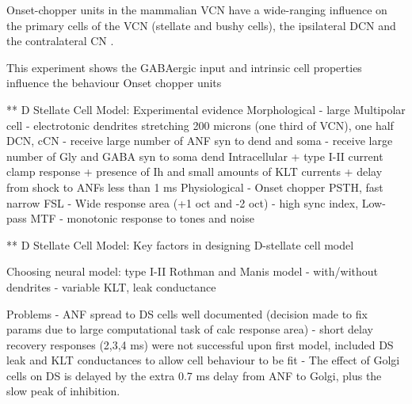 Onset-chopper units in the mammalian VCN have a wide-ranging influence
on the primary cells of the VCN (stellate and bushy cells), the
ipsilateral DCN and the contralateral CN \citep{NeedhamPaolini:2007}.  

This experiment shows the GABAergic input and intrinsic
cell properties  influence the behaviour Onset chopper units


** D Stellate Cell Model:  Experimental evidence
Morphological 
  - large Multipolar cell
  - electrotonic dendrites stretching 200 microns (one third of VCN), one half DCN, cCN 
  - receive large number of ANF syn to dend and soma
  - receive large number of Gly and GABA syn to soma dend
Intracellular
  + type I-II current clamp response
  + presence of Ih and small amounts of KLT currents
  + delay from shock to ANFs less than 1 ms 
Physiological 
  - Onset chopper PSTH, fast narrow FSL 
  - Wide response area (+1 oct and -2 oct)
  - high sync index, Low-pass MTF
  - monotonic response to tones and noise 

** D Stellate Cell Model:  Key factors in designing D-stellate cell model

Choosing neural model: type I-II Rothman and Manis model
  - with/without dendrites
  - variable KLT, leak conductance

Problems
  - ANF spread to DS cells well documented (decision made to
    fix params due to large computational task of calc response area) 
  - short delay recovery responses (2,3,4 ms) were not successful upon
    first model, included DS leak and KLT conductances to allow cell
    behaviour to be fit
  - The effect of Golgi cells on DS is delayed by the extra 0.7 ms delay from ANF to Golgi, plus the slow peak of \GABAa inhibition.



